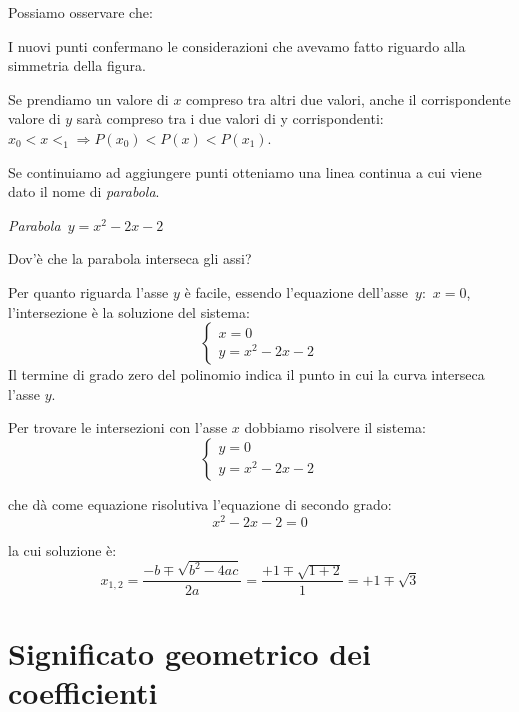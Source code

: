 Possiamo osservare che:

\begin{enumerate*}
 \item I nuovi punti confermano le considerazioni che avevamo fatto riguardo 
 alla simmetria della figura.
 \item Se prendiamo un valore di $x$ compreso tra altri due valori, anche il 
 corrispondente valore di $y$ sarà compreso tra i due valori di y 
 corrispondenti:~$x_0 < x <_1 \Rightarrow P(x_0) < P(x) < P(x_1)$.
\end{enumerate*}

Se continuiamo ad aggiungere punti otteniamo una linea continua a cui viene 
dato il nome di \emph{parabola}.

\begin{minipage}{.40\textwidth}
\begin{center}
 \begin{inaccessibleblock}
  \graficotrinomio
  \emph{Parabola~$y=x^2-2x-2$}\label{fig:parabola_trinomio2}
\end{inaccessibleblock}
\end{center}
\end{minipage}
\begin{minipage}{.55\textwidth}
Dov'è che la parabola interseca gli assi?

Per quanto riguarda l'asse $y$ è facile, essendo l'equazione 
dell'asse~$y$:~$x=0$,
l'intersezione è la soluzione del sistema:
\[\left\{\begin{array}{l}
 x=0 \\
 y=x^2-2x-2 
\end{array}\right.\]
Il termine di grado zero del polinomio indica il punto in cui la curva 
interseca l'asse $y$. 

Per trovare le intersezioni con l'asse $x$ dobbiamo risolvere il sistema:
\[\left\{\begin{array}{l}
 y=0 \\
 y=x^2-2x-2 
\end{array}\right.\]

che dà come equazione risolutiva l'equazione di secondo grado:
\[x^2-2x-2=0\]

la cui soluzione è:
\[x_{1, 2} = \frac{-b \mp\sqrt{b^2-4ac}}{2a}=
             \frac{+1 \mp\sqrt{1+2}}{1}=+1 \mp\sqrt{3}\]

\end{minipage}


\section{Significato geometrico dei coefficienti}
\label{sec:parabola_coefficienti}

